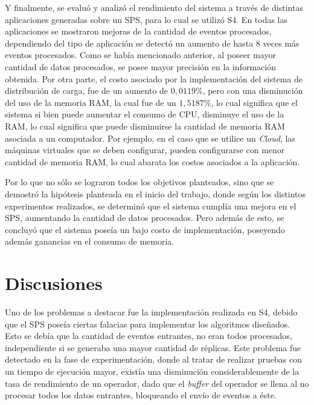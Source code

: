 Y finalmente, se evaluó y analizó el rendimiento del sistema a través de distintas aplicaciones generadas sobre un SPS, para lo cual se utilizó S4. En todas las aplicaciones se mostraron mejoras de la cantidad de eventos procesados, dependiendo del tipo de aplicación se detectó un aumento de hasta 8 veces más eventos procesados. Como se había mencionado anterior, al poseer mayor cantidad de datos procesados, se posee mayor precisión en la información obtenida. Por otra parte, el costo asociado por la implementación del sistema de distribución de carga, fue de un aumento de $0,0119\%$, pero con una disminución del uso de la memoria RAM, la cual fue de un $1,5187\%$, lo cual significa que el sistema si bien puede aumentar el consumo de CPU, disminuye el uso de la RAM, lo cual significa que puede disminuirse la cantidad de memoria RAM asociada a un computador. Por ejemplo, en el caso que se utilice un \textit{Cloud}, las máquinas virtuales que se deben configurar, pueden configurarse con menor cantidad de memoria RAM, lo cual abarata los costos asociados a la aplicación.

Por lo que no sólo se lograron todos los objetivos planteados, sino que se demostró la hipótesis planteada en el inicio del trabajo, donde según los distintos experimentos realizados, se determinó que el sistema cumplía una mejora en el SPS, aumentando la cantidad de datos procesados. Pero además de esto, se concluyó que el sistema poseía un bajo costo de implementación, poseyendo además ganancias en el consumo de memoria.

\section{Discusiones}

Uno de los problemas a destacar fue la implementación realizada en S4, debido que el SPS poseía ciertas falacias para implementar los algoritmos diseñados. Esto se debía que la cantidad de eventos entrantes, no eran todos procesados, independiente si se generaba una mayor cantidad de réplicas. Este problema fue detectado en la fase de experimentación, donde al tratar de realizar pruebas con un tiempo de ejecución mayor, existía una disminución considerablemente de la tasa de rendimiento de un operador, dado que el \textit{buffer} del operador se llena al no procesar todos los datos entrantes, bloqueando el envío de eventos a éste.

